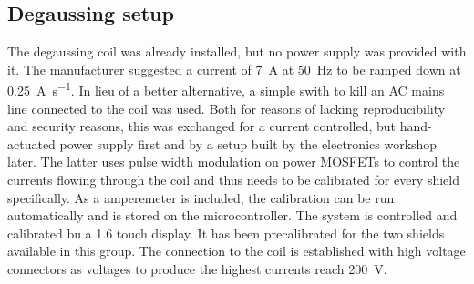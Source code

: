         \subsection{Degaussing setup}
        The degaussing coil was already installed, but no power supply was provided with it. The manufacturer suggested a current of \SI{7}{\ampere} at \SI{50}{\hertz} to be ramped down at \SI{0.25}{\ampere\per\second}. In lieu of a better alternative, a simple swith to kill an AC mains line connected to the coil was used. Both for reasons of lacking reproducibility and security reasons, this was exchanged for a current controlled, but hand-actuated power supply first and by a setup built by the electronics workshop later. The latter uses pulse width modulation on power MOSFETs to control the currents flowing through the coil and thus needs to be calibrated for every shield specifically. As a amperemeter is included, the calibration can be run automatically and is stored on the microcontroller. The system is controlled and calibrated bu a \SI{1.6}{\in} touch display. It has been precalibrated for the two shields available in this group. The connection to the coil is established with high voltage connectors as voltages to produce the highest currents reach \SI{200}{\volt}.
